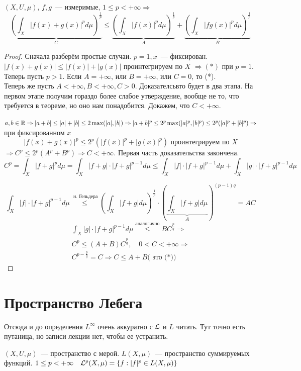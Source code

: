 \documentclass[document]{subfiles}
\begin{document}
\begin{theorem}
    $(X, U, \mu)$, $f, g$~--- измеримые, $1 \leq p < + \infty \Rightarrow$
    \[ \underbrace{\left( \int_X |f(x) + g(x)|^p d \mu \right)^{\frac{1}{p}}}_{C}  \leq \underbrace{\left( \int_X |f(x)|^p d \mu \right)^{\frac{1}{p}}}_{A} + 
    \underbrace{\left( \int_X |fg(x)|^p d \mu \right)^{\frac{1}{p}}}_{B} \tag{*} \]
    
\end{theorem}
\begin{proof}
    Сначала разберём простые случаи. $p = 1, x$~--- фиксирован. $|f(x) + g(x)| \leq |f(x)| + |g(x)|$ проинтегрируем по $X$ $\Rightarrow (*)$ при $p = 1$.
    Теперь пусть $p > 1$. Если $A = +\infty$, или $B = +\infty$, или $C = 0$, то (*). \\
    Теперь же пусть $A < +\infty, B < +\infty, C > 0$. 
    Доказателсьвто будет в два этапа. На первом этапе получим гораздо более слабое утверждение, вообще не то, что требуется в теореме, но оно нам понадобится.
    Докажем, что $C < + \infty$.
    
    $a,b \in \mathbb{R} \Rightarrow |a+b| \leq |a| + |b| \leq 2 \max(|a|, |b|) \Rightarrow |a+b|^p \leq 2^p \max(|a|^p, |b|^p) \leq 2^p(|a|^p + |b|^p) \Rightarrow$
    при фиксированном $x$ 
    \[ |f(x) + g(x) |^p \leq 2^p (|f(x)|^p + |g(x)|^p) \text{ проинтегрируем по } X \]
    $\Rightarrow C^p \leq 2^p(A^p + B^p) \Rightarrow C < + \infty$.
    Первая часть доказательства закончена. \\
    \[ C^p = \int_X |f+g|^p d \mu = \int_X |f+g| \cdot |f + g|^{p-1} d \mu \leq \int_X |f| \cdot |f+g|^{p-1} d\mu + \int_X |g| \cdot |f+g|^{p-1} d \mu \]

    \[ \int_X |f| \cdot |f+g|^{p-1} d\mu \stackrel{\text{ н. Гельдера}}{\leq} \left( \int_X |f+g| d\mu \right)^{\frac{1}{p}} \cdot \left( \underbrace{\int_X |f+g| d\mu}_{A} \right)^{(p-1)q} %
    = AC \]
    \begin{gather*}
        \int_X |g| \cdot |f+g|^{p-1} d \mu \stackrel{\text{аналогично}}{\leq} BC^{\frac{p}{q}} \Rightarrow \\
        C^p \leq (A+B) C^{\frac{p}{q}}, \quad 0 < C < + \infty \Rightarrow \\
        C^{p - \frac{p}{q}} = C \Rightarrow C \leq A + B \text{( это (*))}
    \end{gather*}
\end{proof}

\section{Пространство Лебега}
Отсюда и до определения $L^\infty$ очень аккуратно с $\mathcal{L}$ и $L$ читать. Тут точно есть путаница, но записи лекции нет, чтобы ее устранить.
\begin{definition}
    $(X, U, \mu)$~--- пространство с мерой. $L(X, \mu)$~--- пространство суммируемых функций. $1 \leq p < +\infty \quad \mathcal{L}^p(X, \mu) = \{ f: |f|^p \in L(X,\mu) \}$ 
\end{definition}
\end{document}
